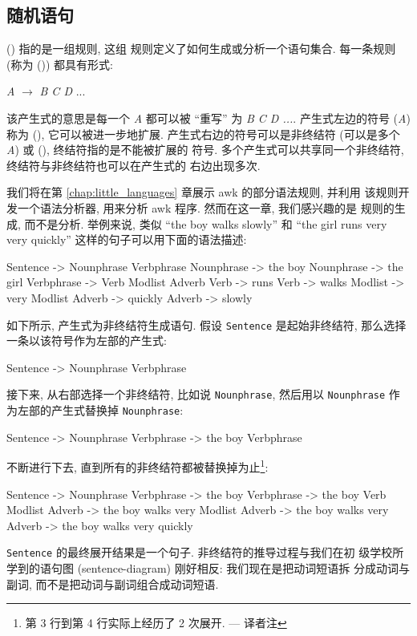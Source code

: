 \subsection{随机语句}
\label{subsec:random_sentences}

 () 指的是一组规则, 这组
规则定义了如何生成或分析一个语句集合. 每一条规则 (称为 
()) 都具有形式:
\begin{pattern}
    \indent\indent\textit{A} $\longrightarrow$ \textit{B C D} ...
\end{pattern}
该产生式的意思是每一个 \textit{A} 都可以被 ``重写'' 为 \textit{B C D ...}.
产生式左边的符号 (\textit{A}) 称为  (),
它可以被进一步地扩展. 产生式右边的符号可以是非终结符 (可以是多个
\textit{A}) 或  (), 终结符指的是不能被扩展的
符号. 多个产生式可以共享同一个非终结符, 终结符与非终结符也可以在产生式的
右边出现多次.

我们将在第 \ref{chap:little_languages} 章展示 awk 的部分语法规则, 并利用
该规则开发一个语法分析器, 用来分析 awk 程序. 然而在这一章, 我们感兴趣的是
规则的生成, 而不是分析. 举例来说, 类似 ``the boy walks slowly'' 和 ``the
girl runs very very quickly'' 这样的句子可以用下面的语法描述:
\begin{awkcode}
    Sentence -> Nounphrase Verbphrase
    Nounphrase -> the boy
    Nounphrase -> the girl
    Verbphrase -> Verb Modlist Adverb
    Verb -> runs
    Verb -> walks
    Modlist -> very Modlist
    Adverb -> quickly
    Adverb -> slowly
\end{awkcode}

如下所示, 产生式为非终结符生成语句. 假设 \texttt{Sentence} 是起始非终结符,
那么选择一条以该符号作为左部的产生式:
\begin{awkcode}
    Sentence -> Nounphrase Verbphrase
\end{awkcode}
接下来, 从右部选择一个非终结符, 比如说 \texttt{Nounphrase}, 然后用以
\texttt{Nounphrase} 作为左部的产生式替换掉 \texttt{Nounphrase}:
\begin{awkcode}
    Sentence -> Nounphrase Verbphrase
             -> the boy Verbphrase
\end{awkcode}
不断进行下去, 直到所有的非终结符都被替换掉为止\footnote{第 3 行到第 4
行实际上经历了 2 次展开. --- 译者注}:
\begin{awkcode}
    Sentence -> Nounphrase Verbphrase
             -> the boy Verbphrase
             -> the boy Verb Modlist Adverb
             -> the boy walks very Modlist Adverb
             -> the boy walks very Adverb
             -> the boy walks very quickly
\end{awkcode}
\texttt{Sentence} 的最终展开结果是一个句子. 非终结符的推导过程与我们在初
级学校所学到的语句图 (sentence-diagram) 刚好相反: 我们现在是把动词短语拆
分成动词与副词, 而不是把动词与副词组合成动词短语.

